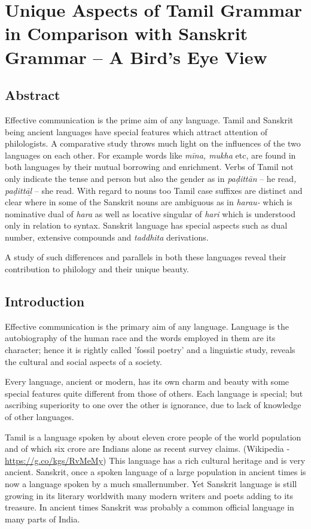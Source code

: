 
\chapter{Unique Aspects of Tamil Grammar in Comparison with Sanskrit Grammar – A Bird’s Eye View}\label{chap05}



\section*{Abstract}

Effective communication is the prime aim of any language. Tamil and Sanskrit being ancient languages have special features which attract attention of philologists. A comparative study throws much light on the influences of the two languages on each other. For example words like \textit{mīna, mukha} etc, are found in both languages by their mutual borrowing and enrichment. Verbs of Tamil not only indicate the tense and person but also the gender as in \textit{paḍittān} – he read\textit{, paḍittāḻ} – she read. With regard to nouns too Tamil case suffixes are distinct and clear where in some of the Sanskrit nouns are ambiguous as in \textit{harau-} which is nominative dual of \textit{hara} as well as locative singular of \textit{hari} which is understood only in relation to syntax. Sanskrit language has special aspects such as dual number, extensive compounds and \textit{taddhita} derivations.

A study of such differences and parallels in both these languages reveal their contribution to philology and their unique beauty.


\section*{Introduction}

Effective communication is the primary aim of any language. Language is the autobiography of the human race and the words employed in them are its character; hence it is rightly called 'fossil poetry’ and a linguistic study, reveals the cultural and social aspects of a society.

Every language, ancient or modern, has its own charm and beauty with some special features quite different from those of others. Each language is special; but ascribing superiority to one over the other is ignorance, due to lack of knowledge of other languages.

Tamil is a language spoken by about eleven crore people of the world population and of which six crore are Indians alone as recent survey claims. (Wikipedia - \url{https://g.co/kgs/RvMeMy}) This language has a rich cultural heritage and is very ancient. Sanskrit, once a spoken language of a large population in ancient times is now a language spoken by a much smallernumber. Yet Sanskrit language is still growing in its literary worldwith many modern writers and poets adding to its treasure. In ancient times Sanskrit was probably a common official language in many parts of India.

